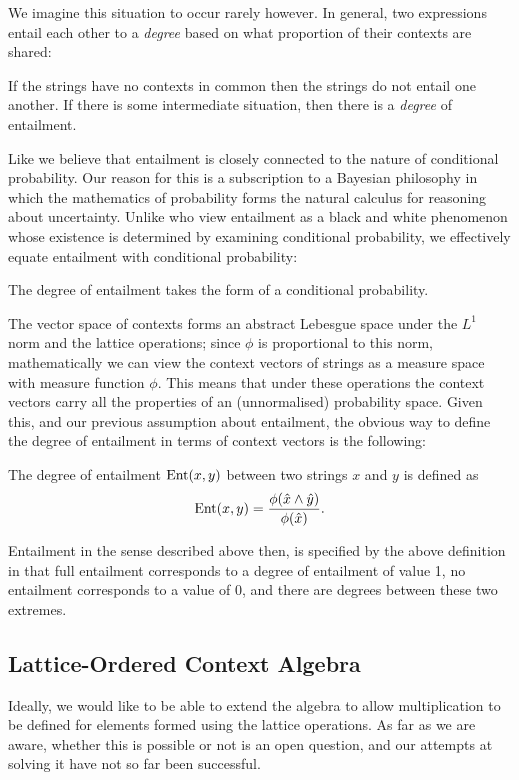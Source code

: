 \documentclass[11pt]{report}
\begin{document}
We imagine this situation to occur rarely however. In general, two expressions entail each other to a \emph{degree} based on what proportion of their contexts are shared: 
\begin{assumption}If the strings have no contexts in common then the strings do not entail one another. If there is some intermediate situation, then there is a \emph{degree} of entailment.\end{assumption}\noindent
Like \cite{Glickman:05} we believe that entailment is closely connected to the nature of conditional probability. Our reason for this is a subscription to a Bayesian philosophy in which the mathematics of probability forms the natural calculus for reasoning about uncertainty. Unlike \citeauthor{Glickman:05} who view entailment as a black and white phenomenon whose existence is determined by examining conditional probability, we effectively equate entailment with conditional probability:
\begin{assumption}
The degree of entailment takes the form of a conditional probability.
\end{assumption}
\noindent
The vector space of contexts forms an abstract Lebesgue space under the $L^1$ norm and the lattice operations; since $\phi$ is proportional to this norm, mathematically we can view the context vectors of strings as a measure space with measure function $\phi$. This means that under these operations the context vectors carry all the properties of an (unnormalised) probability space. Given this, and our previous assumption about entailment, the obvious way to define the degree of entailment in terms of context vectors is the following:
\begin{defn}
The degree of entailment $\operatorname{Ent}(x,y)$ between two strings $x$ and $y$ is defined as
$$\operatorname{Ent}(x,y) = \frac{\phi(\hat{x}\land\hat{y})}{\phi(\hat{x})}.$$
\end{defn}
Entailment in the sense described above then, is specified by the above definition in that full entailment corresponds to a degree of entailment of value 1, no entailment corresponds to a value of 0, and there are degrees between these two extremes.

\subsection{Lattice-Ordered Context Algebra}

Ideally, we would like to be able to extend the algebra to allow multiplication to be defined for elements formed using the lattice operations. As far as we are aware, whether this is possible or not is an open question, and our attempts at solving it have not so far been successful.



\end{document}
